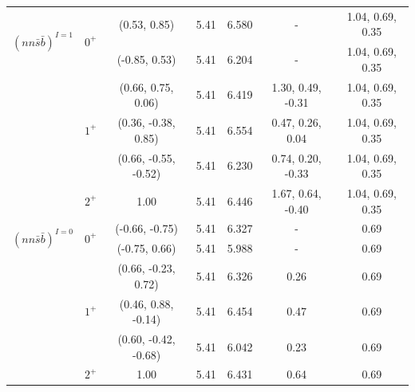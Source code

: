 \documentclass[prd,twocolumn,floatfix,nofootinbib]{revtex4}
\begin{document}
\begin{table}[!htbp]
\begin{tabular}{ccccccc}
        \multirow{2}{*}{${(nn\bar{s}\bar{b})}^{I=1}$}
                        &\multirow{2}{*}{$0^{+}$}
                                    &(0.53, 0.85)           &5.41	    &6.580	    &-                      &1.04, 0.69, 0.35 \\ 
                        &           &(-0.85, 0.53)          &5.41	    &6.204	    &-                      &1.04, 0.69, 0.35 \\ 
                        &\multirow{3}{*}{$1^{+}$}
                                    &(0.66, 0.75, 0.06)     &5.41	    &6.419	    &1.30, 0.49, -0.31      &1.04, 0.69, 0.35 \\ 
                        &           &(0.36, -0.38, 0.85)    &5.41	    &6.554	    &0.47, 0.26, 0.04       &1.04, 0.69, 0.35 \\ 
                        &           &(0.66, -0.55, -0.52)   &5.41	    &6.230	    &0.74, 0.20, -0.33      &1.04, 0.69, 0.35 \\ 
                        &$2^{+}$    &1.00                   &5.41	    &6.446	    &1.67, 0.64, -0.40      &1.04, 0.69, 0.35 \\ 
        \multirow{2}{*}{${(nn\bar{s}\bar{b})}^{I=0}$}
                        &\multirow{2}{*}{$0^{+}$}
                                    &(-0.66, -0.75)         &5.41	    &6.327	    &-                      &0.69 \\ 
                        &           &(-0.75, 0.66)          &5.41	    &5.988	    &-                      &0.69 \\ 
                        &\multirow{3}{*}{$1^{+}$}                            
                                    &(0.66, -0.23, 0.72)    &5.41	    &6.326	    &0.26                   &0.69 \\ 
                        &           &(0.46, 0.88, -0.14)    &5.41	    &6.454	    &0.47                   &0.69 \\ 
                        &           &(0.60, -0.42, -0.68)   &5.41	    &6.042	    &0.23                   &0.69 \\ 
                        &$2^{+}$    &1.00                   &5.41	    &6.431	    &0.64                   &0.69 \\ 
        \hline\hline
    \end{tabular}
\end{table}
\end{document}
